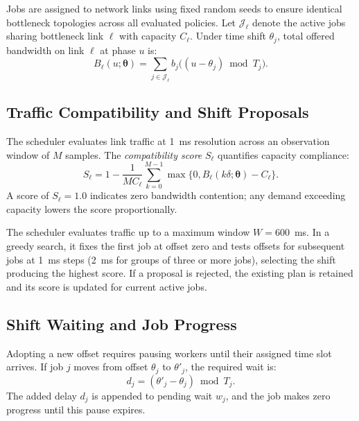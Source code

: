 \documentclass[conference]{IEEEtran}
\begin{document}
Jobs are assigned to network links using fixed random seeds to ensure identical bottleneck topologies across all evaluated policies. Let $\mathcal{J}_{\ell}$ denote the active jobs sharing bottleneck link $\ell$ with capacity $C_{\ell}$. Under time shift $\theta_j$, total offered bandwidth on link $\ell$ at phase $u$ is:
\begin{equation}
 B_{\ell}(u;\boldsymbol{\theta}) =
 \sum_{j\in\mathcal{J}_{\ell}}
 b_j\bigl((u-\theta_j)\bmod T_j\bigr).
 \label{eq:offered-load}
\end{equation}

\subsection{Traffic Compatibility and Shift Proposals}

The scheduler evaluates link traffic at 1~ms resolution across an observation window of $M$ samples. The \emph{compatibility score} $S_{\ell}$ quantifies capacity compliance:
\begin{equation}
 S_{\ell} = 1 - \frac{1}{M C_{\ell}}
 \sum_{k=0}^{M-1}
 \max\{0,B_{\ell}(k\delta;\boldsymbol{\theta})-C_{\ell}\}.
 \label{eq:compatibility}
\end{equation}
A score of $S_{\ell} = 1.0$ indicates zero bandwidth contention; any demand exceeding capacity lowers the score proportionally.

The scheduler evaluates traffic up to a maximum window $W = 600$~ms. In a greedy search, it fixes the first job at offset zero and tests offsets for subsequent jobs at 1~ms steps (2~ms for groups of three or more jobs), selecting the shift producing the highest score. If a proposal is rejected, the existing plan is retained and its score is updated for current active jobs.

\subsection{Shift Waiting and Job Progress}

Adopting a new offset requires pausing workers until their assigned time slot arrives. If job $j$ moves from offset $\theta_j$ to $\theta'_j$, the required wait is:
\begin{equation}
 d_j = (\theta'_j-\theta_j)\bmod T_j.
 \label{eq:shift-wait}
\end{equation}
The added delay $d_j$ is appended to pending wait $w_j$, and the job makes zero progress until this pause expires.
\end{document}
